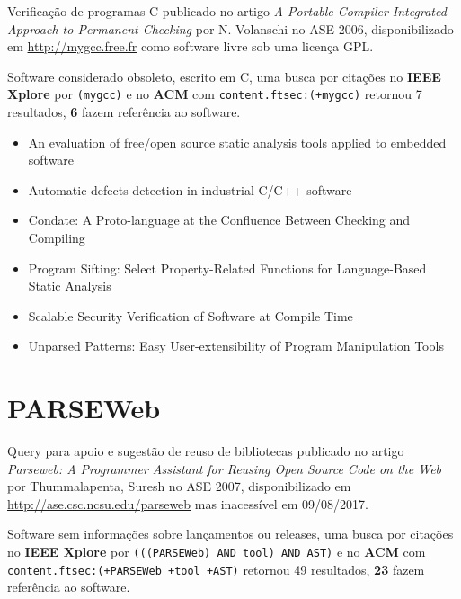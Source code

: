 Verificação de programas C
publicado no artigo {\it A Portable Compiler-Integrated Approach to Permanent Checking}
por N. Volanschi
no ASE 2006,
disponibilizado em \url{http://mygcc.free.fr}
como software livre
sob uma licença GPL.

Software considerado obsoleto,
escrito em C,
uma busca por citações no {\bf IEEE Xplore} por
\texttt{(mygcc)}
e no {\bf ACM} com
\texttt{content.ftsec:(+mygcc)}
retornou
7 resultados,
{\bf 6} fazem referência ao software.

\begin{itemize}
\item An evaluation of free/open source static analysis tools applied to embedded software
\item Automatic defects detection in industrial C/C++ software
\item Condate: A Proto-language at the Confluence Between Checking and Compiling
\item Program Sifting: Select Property-Related Functions for Language-Based Static Analysis
\item Scalable Security Verification of Software at Compile Time
\item Unparsed Patterns: Easy User-extensibility of Program Manipulation Tools
\end{itemize}


\section{PARSEWeb}

Query para apoio e sugestão de reuso de bibliotecas
publicado no artigo {\it Parseweb: A Programmer Assistant for Reusing Open Source Code on the Web}
por Thummalapenta, Suresh
no ASE 2007,
disponibilizado em \url{http://ase.csc.ncsu.edu/parseweb}
mas inacessível em 09/08/2017.

Software sem informações sobre lançamentos ou releases,
uma busca por citações no {\bf IEEE Xplore} por
\texttt{(((PARSEWeb) AND tool) AND AST)}
e no {\bf ACM} com
\texttt{content.ftsec:(+PARSEWeb +tool +AST)}
retornou
49 resultados,
{\bf 23} fazem referência ao software.

